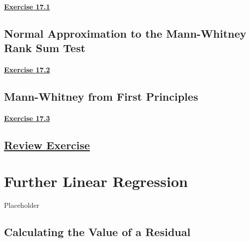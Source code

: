 \documentclass[
  11pt,
]{book}
\begin{document}
\subsubsection*{\texorpdfstring{\hyperref[ex171a]{Exercise 17.1}}{Exercise 17.1}}\label{exercise-17.1}

\section{Normal Approximation to the Mann-Whitney Rank Sum Test}\label{normal-approximation-to-the-mann-whitney-rank-sum-test}

\subsubsection*{\texorpdfstring{\hyperref[ex172a]{Exercise 17.2}}{Exercise 17.2}}\label{exercise-17.2}

\section{Mann-Whitney from First Principles}\label{mann-whitney-from-first-principles}

\subsubsection*{\texorpdfstring{\hyperref[ex173a]{Exercise 17.3}}{Exercise 17.3}}\label{exercise-17.3}

\section*{\texorpdfstring{\hyperref[re17a]{Review Exercise}}{Review Exercise}}\label{review-exercise-16}

\chapter{Further Linear Regression}\label{further-linear-regression}

Placeholder

\section{Calculating the Value of a Residual}\label{calculating-the-value-of-a-residual}
\end{document}
